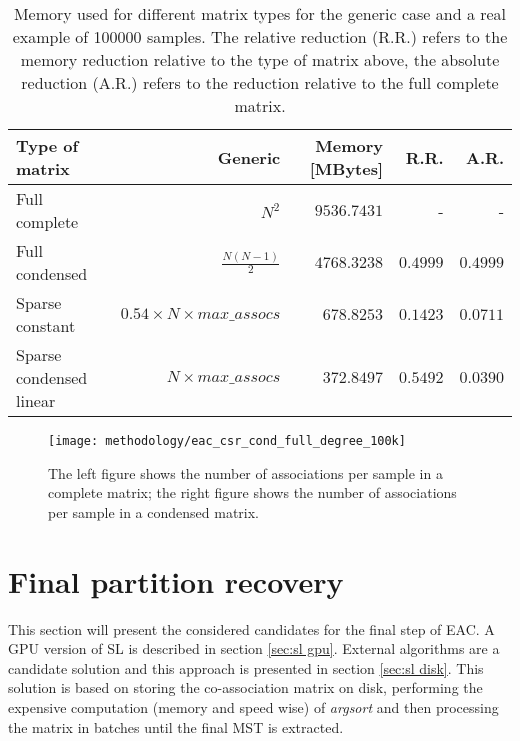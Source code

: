 \begin{table}[hbtp]
\centering
\caption{Memory used for different matrix types for the generic case and a real example of 100000 samples. The relative reduction (R.R.) refers to the memory reduction relative to the type of matrix above, the absolute reduction (A.R.) refers to the reduction relative to the full complete matrix.}
\label{tab:mat type memory}
\begin{tabular}{lrrrr}
\toprule
\textbf{Type of matrix}          & \textbf{Generic}                & \textbf{Memory {[}MBytes{]}}    & \textbf{R.R.} & \textbf{A.R.} \\
\midrule%
Full complete           & $N^2$                  & $9536.7431$              & -                  & -             \\
Full condensed          & $\frac{N(N-1)}{2}$     & $4768.3238$              & $0.4999$     & $0.4999$      \\
Sparse constant         & $ 0.54 \times N \times max\_assocs$ & $678.8253$               & $0.1423$           & $0.0711$      \\
Sparse condensed linear & $N \times max\_assocs$ & $372.8497$               & $0.5492$           & $0.0390$      \\
\bottomrule
\end{tabular}
\end{table}


\begin{figure}[hbtp]
\centering
\texttt{[image: methodology/eac\_csr\_cond\_full\_degree\_100k]}
\caption{The left figure shows the number of associations per sample in a complete matrix; the right figure shows the number of associations per sample in a condensed matrix.}
\label{fig:coassoc degree}
\end{figure}


\section{Final partition recovery}

This section will present the considered candidates for the final step of EAC.
A GPU version of SL is described in section \ref{sec:sl gpu}.
External algorithms are a candidate solution and this approach is presented in section \ref{sec:sl disk}.
This solution is based on storing the co-association matrix on disk, performing the expensive computation (memory and speed wise) of \emph{argsort} and then processing the matrix in batches until the final MST is extracted.

